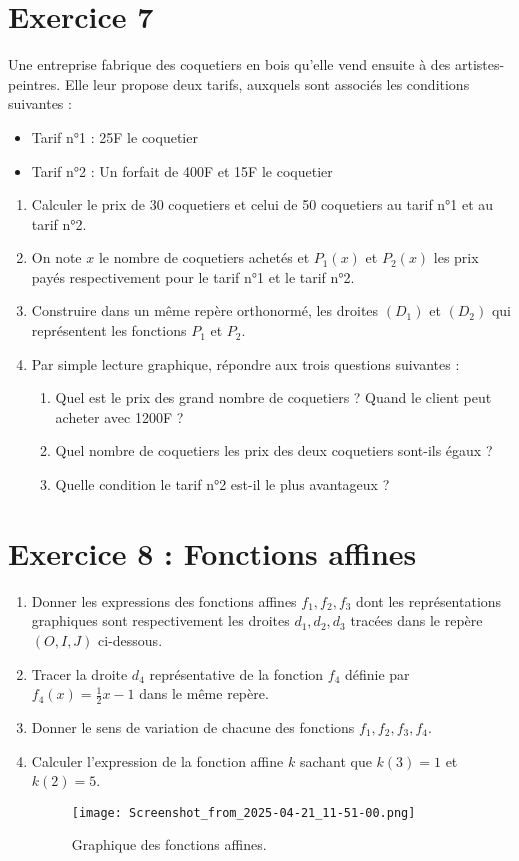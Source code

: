 \documentclass[12pt,a4paper]{article}
\begin{document}
\begin{multicols}{2}
\section*{Exercice 7}
Une entreprise fabrique des coquetiers en bois qu’elle vend ensuite à des artistes-peintres. Elle leur propose deux tarifs, auxquels sont associés les conditions suivantes :
\begin{itemize}
    \item Tarif n°1 : 25F le coquetier
    \item Tarif n°2 : Un forfait de 400F et 15F le coquetier
\end{itemize}
\begin{enumerate}
    \item Calculer le prix de 30 coquetiers et celui de 50 coquetiers au tarif n°1 et au tarif n°2.
    \item On note $x$ le nombre de coquetiers achetés et $P_1(x)$ et $P_2(x)$ les prix payés respectivement pour le tarif n°1 et le tarif n°2.
    \item Construire dans un même repère orthonormé, les droites $(D_1)$ et $(D_2)$ qui représentent les fonctions $P_1$ et $P_2$.
    \item Par simple lecture graphique, répondre aux trois questions suivantes :
    \begin{enumerate}
        \item Quel est le prix des grand nombre de coquetiers ? Quand le client peut acheter avec 1200F ?
        \item Quel nombre de coquetiers les prix des deux coquetiers sont-ils égaux ?
        \item Quelle condition le tarif n°2 est-il le plus avantageux ?
    \end{enumerate}
\end{enumerate}

\section*{Exercice 8 : Fonctions affines}

\begin{enumerate}
    \item Donner les expressions des fonctions affines \( f_1, f_2, f_3 \) dont les représentations graphiques sont respectivement les droites \( d_1, d_2, d_3 \) tracées dans le repère \( (O, I, J) \) ci-dessous.
    \item Tracer la droite \( d_4 \) représentative de la fonction \( f_4 \) définie par \( f_4(x) = \frac{1}{2}x - 1 \) dans le même repère.
    \item Donner le sens de variation de chacune des fonctions \( f_1, f_2, f_3, f_4 \).
    \item Calculer l'expression de la fonction affine \( k \) sachant que \( k(3) = 1 \) et \( k(2) = 5 \).
\begin{figure}[H]
    \centering
    \texttt{[image: Screenshot\_from\_2025-04-21\_11-51-00.png]}
    \caption{Graphique des fonctions affines.}
\end{figure}
\end{enumerate}
\end{multicols}
\end{document}
